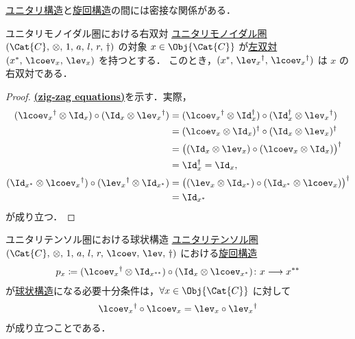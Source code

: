 \documentclass[TQFT_main]{subfiles}
\begin{document}
\hyperref[def:unitary-monoidal]{ユニタリ構造}と\hyperref[def:pivotal]{旋回構造}の間には密接な関係がある．

\begin{mylem}[label=lem:rdual-unitary]{ユニタリモノイダル圏における右双対}
    \hyperref[def:unitary-monoidal]{ユニタリモノイダル圏} $(\Cat{C},\, \otimes,\, 1,\, a,\, l,\, r,\, \dagger)$ の対象 $x \in \Obj{\Cat{C}}$ が\hyperref[def:dual]{左双対} $(x^*,\, \lcoev_x,\, \lev_x)$ を持つとする．
    このとき，$(x^*,\, \lev_x{}^\dagger,\, \lcoev_x{}^\dagger)$ は $x$ の右双対である．
\end{mylem}

\begin{proof}
    \hyperref[def:dual]{\textsf{\textbf{(zig-zag equations)}}}を示す．実際，
    \begin{align}
        (\lcoev_x{}^\dagger \otimes \Id_x) \circ (\Id_x \otimes \lev_x{}^\dagger)
        &= (\lcoev_x{}^\dagger \otimes \Id_x^\dagger) \circ (\Id_x^\dagger \otimes \lev_x{}^\dagger) \\
        &= (\lcoev_x \otimes \Id_x)^\dagger \circ (\Id_x \otimes \lev_x)^\dagger \\
        &= \bigl( (\Id_x \otimes \lev_x) \circ (\lcoev_x \otimes \Id_x)\bigr)^\dagger \\
        &= \Id_x^\dagger = \Id_x, \\
        (\Id_{x^*} \otimes \lcoev_x{}^\dagger) \circ (\lev_x{}^\dagger \otimes \Id_{x^*})
        &= \bigl( (\lev_x\otimes \Id_{x^*}) \circ (\Id_{x^*} \otimes \lcoev_x) \bigr)^\dagger \\
        &= \Id_{x^*}
    \end{align}
    が成り立つ．
\end{proof}

\begin{myprop}[label=prop:spherical-unitary]{ユニタリテンソル圏における球状構造}
    \hyperref[def:unitary-monoidal]{ユニタリ}\hyperref[def:tensorfusion-cat]{テンソル圏} $(\Cat{C},\, \otimes,\, 1,\, a,\, l,\, r,\, \lcoev,\, \lev,\, \dagger)$ における\hyperref[def:pivotal]{旋回構造}
    \begin{align}
        p_x \coloneqq (\lcoev_x{}^\dagger \otimes \Id_{x^{**}}) \circ (\Id_x \otimes \lcoev_{x^*}) \colon x \lto x^{**}
    \end{align}
    が\hyperref[def:spherical]{球状構造}になる必要十分条件は，$\forall x \in \Obj{\Cat{C}}$ に対して
    \begin{align}
        \lcoev_x{}^\dagger \circ \lcoev_x = \lev_x \circ \lev_x{}^\dagger
    \end{align}
    が成り立つことである．
\end{myprop}
\end{document}
